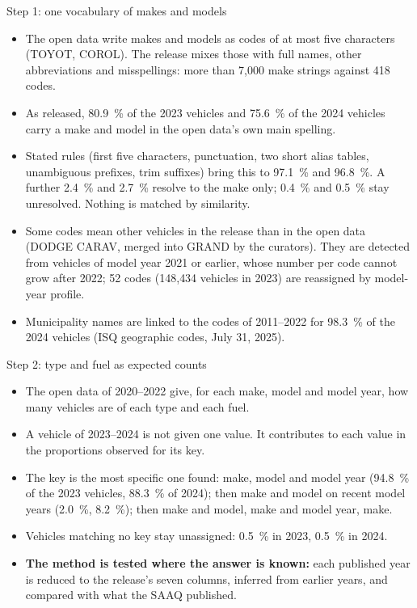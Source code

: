 \documentclass[aspectratio=169,10pt]{beamer}\usetheme{default}\usecolortheme{seahorse}\setbeamertemplate{navigation symbols}{}\setbeamertemplate{footline}[frame number]
\begin{document}
\begin{frame}{Step 1: one vocabulary of makes and models}
\begin{itemize}\setlength\itemsep{5pt}
\item The open data write makes and models as codes of at most five characters (TOYOT, COROL). The release mixes those with full names, other abbreviations and misspellings: more than 7{,}000 make strings against 418 codes.
\item As released, 80.9~\% of the 2023 vehicles and 75.6~\% of the 2024 vehicles carry a make and model in the open data's own main spelling.
\item Stated rules (first five characters, punctuation, two short alias tables, unambiguous prefixes, trim suffixes) bring this to 97.1~\% and 96.8~\%. A further 2.4~\% and 2.7~\% resolve to the make only; 0.4~\% and 0.5~\% stay unresolved. Nothing is matched by similarity.
\item Some codes mean other vehicles in the release than in the open data (DODGE CARAV, merged into GRAND by the curators). They are detected from vehicles of model year 2021 or earlier, whose number per code cannot grow after 2022; 52 codes (148{,}434 vehicles in 2023) are reassigned by model-year profile.
\item Municipality names are linked to the codes of 2011--2022 for 98.3~\% of the 2024 vehicles (ISQ geographic codes, July 31, 2025).
\end{itemize}
\end{frame}

\begin{frame}{Step 2: type and fuel as expected counts}
\begin{itemize}\setlength\itemsep{5pt}
\item The open data of 2020--2022 give, for each make, model and model year, how many vehicles are of each type and each fuel.
\item A vehicle of 2023--2024 is not given one value. It contributes to each value in the proportions observed for its key.
\item The key is the most specific one found: make, model and model year (94.8~\% of the 2023 vehicles, 88.3~\% of 2024); then make and model on recent model years (2.0~\%, 8.2~\%); then make and model, make and model year, make.
\item Vehicles matching no key stay unassigned: 0.5~\% in 2023, 0.5~\% in 2024.
\item \textbf{The method is tested where the answer is known:} each published year is reduced to the release's seven columns, inferred from earlier years, and compared with what the SAAQ published.
\end{itemize}
\end{frame}
\end{document}
